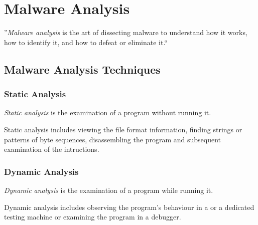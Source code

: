 \chapter{Malware Analysis} \label{chap:analysis}

\begin{definition}
''\emph{Malware analysis} is the art of dissecting malware to understand how it
works, how to identify it, and how to defeat or eliminate it.`` \cite[\p{} xxviii]{sikorski12}
\end{definition} 

\section{Malware Analysis Techniques}

\subsection*{Static Analysis}

\begin{definition}
\emph{Static analysis} is the examination of a program without running it. \cite[\p{} 2]{sikorski12}
\end{definition} 

Static analysis includes \eg{} viewing the file format information, finding strings or patterns of byte sequences, disassembling the program and subsequent examination of the intructions.

\subsection*{Dynamic Analysis}

\begin{definition}
\emph{Dynamic analysis} is the examination of a program while running it. \cite[\p{} 2]{sikorski12}
\end{definition}

Dynamic analysis includes \eg{} observing the program's behaviour in a \VM{} or a dedicated testing machine or examining the program in a debugger.
